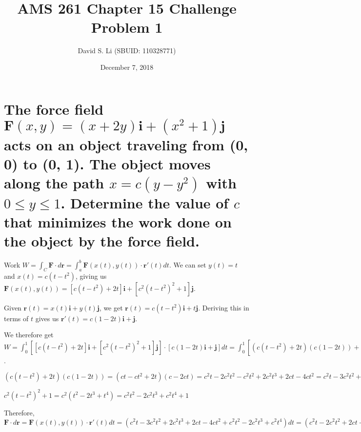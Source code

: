 \documentclass{article}
\title{AMS 261 Chapter 15 Challenge Problem 1}
\author{David S. Li (SBUID: 110328771)}
\date{December 7, 2018}
\begin{document}
\maketitle

\section{The force field $\textbf{F}(x, y) = (x + 2y)\textbf{i} + (x^{2} + 1)\textbf{j}$ acts on an object traveling from (0, 0) to (0, 1).  The object moves along the path $x = c(y - y^{2})$ with $0 \leq y \leq 1$.  Determine the value of $c$ that minimizes the work done on the object by the force field.}

\par\noindent\Large Work $W = \int_{C}\textbf{F}\cdot d\textbf{r} = \int_{a}^{b}\textbf{F}(x(t), y(t))\cdot \textbf{r}'(t)dt$.  We can set $y(t) = t$ and $x(t) = c(t - t^{2})$, giving us $\textbf{F}(x(t), y(t)) = [c(t - t^{2}) + 2t]\textbf{i} + [c^{2}(t - t^{2})^{2} + 1]\textbf{j}$.\vspace{0.25cm}

\par\noindent\Large Given $\textbf{r}(t) = x(t)\textbf{i} + y(t)\textbf{j}$, we get $\textbf{r}(t) = c(t - t^{2})\textbf{i} + t\textbf{j}$.  Deriving this in terms of $t$ gives us $\textbf{r}'(t) = c(1 - 2t)\textbf{i} + \textbf{j}$.\vspace{0.25cm}

\par\noindent\Large We therefore get $W = \int_{0}^{1}[[c(t - t^{2}) + 2t]\textbf{i} + [c^{2}(t - t^{2})^{2} + 1]\textbf{j}]\cdot [c(1 - 2t)\textbf{i} + \textbf{j}]dt = \int_{0}^{1}[(c(t - t^{2}) + 2t)(c(1 - 2t)) + (c^{2}(t - t^{2})^{2} + 1)(1)]dt$.\vspace{0.25cm}

\par\noindent\Large $(c(t - t^{2}) + 2t)(c(1 - 2t)) = (ct - ct^{2} + 2t)(c - 2ct) = c^{2}t - 2c^{2}t^{2} - c^{2}t^{2} + 2c^{2}t^{3} + 2ct - 4ct^{2} = c^{2}t - 3c^{2}t^{2} + 2c^{2}t^{3} + 2ct - 4ct^{2}$\vspace{0.25cm}

\par\noindent $c^{2}(t - t^{2})^{2} + 1 = c^{2}(t^{2} - 2t^{3} + t^{4}) = c^{2}t^{2} - 2c^{2}t^{3} + c^{2}t^{4} + 1$\vspace{0.25cm}

\par\noindent Therefore, $\textbf{F} \cdot d\textbf{r} = \textbf{F}(x(t), y(t)) \cdot \textbf{r}'(t) dt = (c^{2}t - 3c^{2}t^{2} + 2c^{2}t^{3} + 2ct - 4ct^{2} + c^{2}t^{2} - 2c^{2}t^{3} + c^{2}t^{4})dt = (c^{2}t - 2c^{2}t^{2} + 2ct - 4ct^{2} + c^{2}t^{4} + 1)dt$
\end{document}
